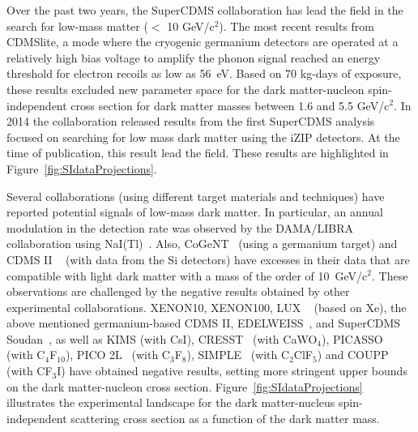 Over the past two years, the SuperCDMS collaboration has lead the field in the search for low-mass matter ($<$ 10 GeV/c$^{2}$).  The most recent results from CDMSlite, a mode where the cryogenic germanium detectors are operated at a relatively high bias voltage to amplify the phonon signal reached an energy threshold for electron recoils as low as 56~eV.  Based on 70 kg-days of exposure, these results excluded new parameter space for the dark matter-nucleon spin-independent cross section for dark matter masses between 1.6 and 5.5 GeV/c$^{2}$.  In 2014 the collaboration released results from the first SuperCDMS analysis focused on searching for low mass dark matter using the iZIP detectors.  At the time of publication, this result lead the field.  These results are highlighted in Figure~\ref{fig:SIdataProjections}.

Several collaborations (using different target materials and techniques) have reported potential signals of low-mass dark matter. In particular, an annual modulation in the detection rate was observed by the DAMA/LIBRA collaboration using NaI(Tl)~\cite{Bernabei:03rnc,Bernabei:08epjc}. %
Also, CoGeNT~\cite{Aalseth:11prl2,Aalseth:11prl,Aalseth:13prd}  (using a germanium target) and CDMS II ~\cite{Agnese:13prl} (with data from the Si detectors) have excesses in their data that are compatible with light dark matter with a mass of the order of 10~GeV/c$^2$. 
These observations are challenged by the negative results obtained by other experimental collaborations. 
XENON10, XENON100, LUX ~\cite{Angle:11prl,Aprile:12prl,Akerib:14prl} (based on Xe), the above mentioned germanium-based
CDMS II, EDELWEISS~\cite{Ahmed:2011gh}, and SuperCDMS Soudan~\cite{Agnese:13prl2,Agnese:2014aze}, as well as KIMS (with CsI), CRESST~\cite{Angloher:2014myn} (with CaWO$_4$),
PICASSO~\cite{Archambault:2012pm} (with C$_4$F$_{10}$), PICO 2L~\cite{Amole:2015lsj} (with C$_3$F$_{8}$), SIMPLE~\cite{Felizardo:2011uw}
(with C$_2$ClF$_5$) and COUPP~\cite{Behnke:2012ys} (with CF$_3$I) have obtained 
negative results, setting more stringent upper bounds on the 
dark matter-nucleon cross section. Figure~\ref{fig:SIdataProjections} illustrates the experimental landscape for the dark matter-nucleus spin-independent scattering cross section as a function of the dark matter mass.

